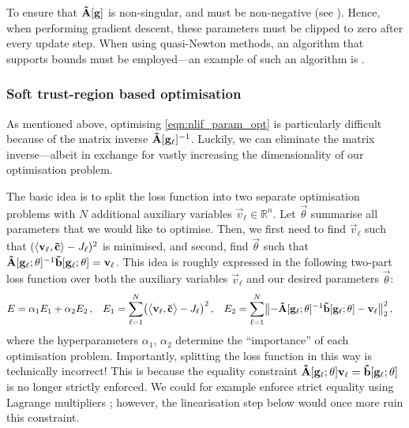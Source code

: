 To ensure that $\mathbf{\tilde A}[\mathbf{g}]$ is non-singular, \vrap and \mrAp must be non-negative (see ).
Hence, when performing gradient descent, these parameters must be clipped to zero after every update step.
When using quasi-Newton methods, an algorithm that supports bounds must be employed---an example of such an algorithm is \LBFGSB \citep{byrd1995limited}.

\subsubsection{Soft trust-region based optimisation}
As mentioned above, optimising \cref{eqn:nlif_param_opt} is particularly difficult because of the matrix inverse $\mathbf{\tilde A}[\mathbf{g}_\ell]^{-1}$.
Luckily, we can eliminate the matrix inverse---albeit in exchange for vastly increasing the dimensionality of our optimisation problem.

The basic idea is to split the loss function into two separate optimisation problems with $N$ additional auxiliary variables $\vec v_\ell \in \mathbb{R}^n$.
Let $\vec \theta$ summarise all parameters that we would like to optimise.
Then, we first need to find $\vec v_\ell$ such that $(\langle \mathbf{v}_\ell, \mathbf{\tilde c} \rangle - J_\ell)^2$ is minimised, and second, find $\vec \theta$ such that $\mathbf{\tilde A}[\mathbf{g}_\ell; \mathbf{\theta}]^{-1} \mathbf{\tilde b}[\mathbf{g}_\ell; \mathbf{\theta}] = \mathbf{v}_\ell$.
This idea is roughly expressed in the following two-part loss function over both the auxiliary variables $\vec v_\ell$ and our desired parameters $\vec \theta$:%
\begin{align}
	E &= \alpha_1 E_1 + \alpha_2 E_2 \,, &
	E_1 &=  \sum_{\ell = 1}^N \bigl( \big\langle \mathbf{v}_\ell, \mathbf{\tilde c} \big\rangle - J_\ell \bigr)^2 \,, &
	E_2 &= \sum_{\ell = 1}^N \bigl\| -\mathbf{\tilde A}[\mathbf{g}_\ell; \mathbf{\theta}]^{-1} \mathbf{\tilde b}[\mathbf{g}_\ell; \mathbf{\theta}] - \mathbf{v}_\ell \bigr\|_2^2 \,,
\end{align}
where the hyperparameters $\alpha_1$, $\alpha_2$ determine the \enquote{importance} of each optimisation problem.
Importantly, splitting the loss function in this way is technically incorrect!
This is because the equality constraint $\mathbf{\tilde A}[\mathbf{g}_\ell; \mathbf{\theta}] \mathbf{v}_\ell = \mathbf{\tilde b}[\mathbf{g}_\ell; \mathbf{\theta}]$ is no longer strictly enforced.
We could for example enforce strict equality using Lagrange multipliers \citep[e.g.,][Section~5.1]{boyd2004convex}; however, the linearisation step below would once more ruin this constraint.

